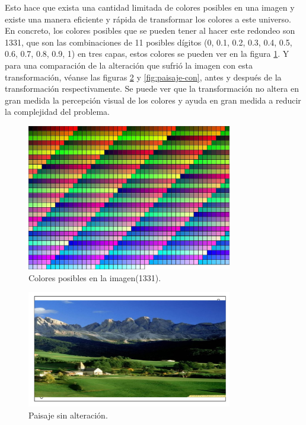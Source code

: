 Esto hace que exista una cantidad limitada de colores posibles en una imagen y existe una manera eficiente y rápida de transformar los colores a este universo. En concreto, los colores posibles que se pueden tener al hacer este redondeo son 1331, que son las combinaciones de 11 posibles dígitos (0, 0.1, 0.2, 0.3, 0.4, 0.5, 0.6, 0.7, 0.8, 0.9, 1) en tres capas, estos colores se pueden ver en la figura \ref{fig:colores-definidos}.  Y para una comparación de la alteración que sufrió  la imagen con esta transformación, véanse las figuras \ref{fig:paisaje-sin} y \ref{fig:paisaje-con}, antes y después de la transformación respectivamente. Se puede ver que la transformación no altera en gran medida la percepción visual de los colores y ayuda en gran medida a reducir la complejidad del problema.

\begin{figure}[H]
\centering
\includegraphics[width=0.8\textwidth]{Figures/colores_definidos.jpg}
\caption{Colores posibles en la imagen(1331).}
\label{fig:colores-definidos}
\end{figure}

\begin{figure}[H]
\centering
\includegraphics[width=0.8\textwidth]{Figures/paisaje_sin.jpg}
\caption{Paisaje sin alteración.}
\label{fig:paisaje-sin}
\end{figure}

